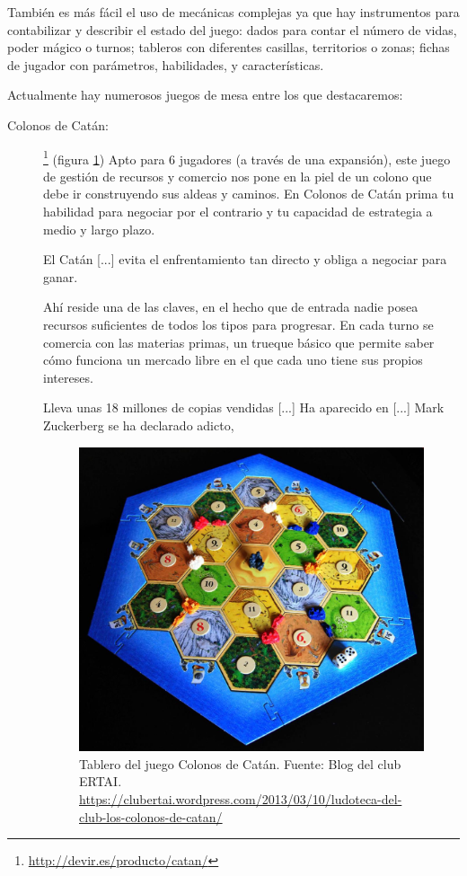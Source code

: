 También es más fácil el uso de mecánicas complejas ya que hay instrumentos para contabilizar y describir el estado del juego: dados para contar el número de vidas, poder mágico o turnos; tableros con diferentes casillas, territorios o zonas; fichas de jugador con parámetros, habilidades, y características.

Actualmente hay numerosos juegos de mesa entre los que destacaremos:
\begin{description}
\item[Colonos de Catán: ] \footnote{\url{http://devir.es/producto/catan/}} (figura \ref{catan})  Apto para 6 jugadores (a través de una expansión), este juego de gestión de recursos y comercio nos pone en la piel de un colono que debe ir construyendo sus aldeas y caminos. En Colonos de Catán prima tu habilidad para negociar por el contrario y tu capacidad de estrategia a medio y largo plazo. \cite{faceentrepreneurship2016}

El Catán [...] evita el enfrentamiento tan directo y obliga a negociar para ganar.

Ahí reside una de las claves, en el hecho que de entrada nadie posea recursos suficientes de todos los tipos para progresar. En cada turno se comercia con las materias primas, un trueque básico que permite saber cómo funciona un mercado libre en el que cada uno tiene sus propios intereses. \cite{albertini2015}

Lleva unas 18 millones de copias vendidas [...] Ha aparecido en  [...] Mark Zuckerberg se ha declarado adicto,  \cite{albertini2015}

\begin{figure}
\begin{center}
\includegraphics[scale=0.3]{imagenes/catan.jpg}
\caption{Tablero del juego Colonos de Catán.  Fuente: Blog del club ERTAI. \url{https://clubertai.wordpress.com/2013/03/10/ludoteca-del-club-los-colonos-de-catan/}}
\label{catan}
\end{center}
\end{figure}



\end{description}
